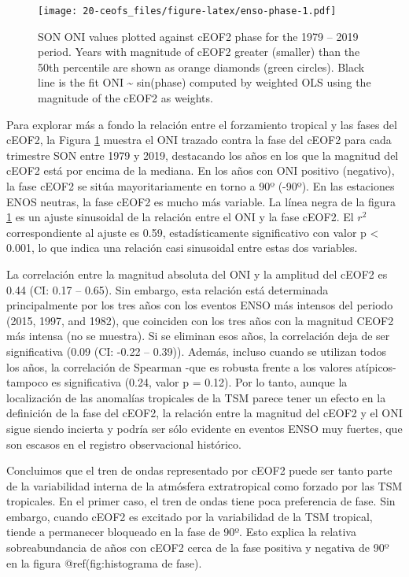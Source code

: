 \documentclass[12pt,oneside]{reedthesis}
\begin{document}
\begin{figure}
\centering
\texttt{[image: 20-ceofs\_files/figure-latex/enso-phase-1.pdf]}
\caption{\label{fig:enso-phase}SON ONI values plotted against cEOF2 phase for the 1979 -- 2019 period. Years with magnitude of cEOF2 greater (smaller) than the 50th percentile are shown as orange diamonds (green circles). Black line is the fit ONI \textasciitilde{} sin(phase) computed by weighted OLS using the magnitude of the cEOF2 as weights.}
\end{figure}
Para explorar más a fondo la relación entre el forzamiento tropical y las fases del cEOF2, la Figura \ref{fig:enso-phase} muestra el ONI trazado contra la fase del cEOF2 para cada trimestre SON entre 1979 y 2019, destacando los años en los que la magnitud del cEOF2 está por encima de la mediana.
En los años con ONI positivo (negativo), la fase cEOF2 se sitúa mayoritariamente en torno a 90º (-90º).
En las estaciones ENOS neutras, la fase cEOF2 es mucho más variable.
La línea negra de la figura \ref{fig:enso-phase} es un ajuste sinusoidal de la relación entre el ONI y la fase cEOF2.
El \(r^2\) correspondiente al ajuste es 0.59, estadísticamente significativo con valor p \textless{} 0.001, lo que indica una relación casi sinusoidal entre estas dos variables.

La correlación entre la magnitud absoluta del ONI y la amplitud del cEOF2 es 0.44 (CI: 0.17 -- 0.65).
Sin embargo, esta relación está determinada principalmente por los tres años con los eventos ENSO más intensos del periodo (2015, 1997, and 1982), que coinciden con los tres años con la magnitud CEOF2 más intensa (no se muestra).
Si se eliminan esos años, la correlación deja de ser significativa (0.09 (CI: -0.22 -- 0.39)).
Además, incluso cuando se utilizan todos los años, la correlación de Spearman -que es robusta frente a los valores atípicos- tampoco es significativa (0.24, valor p = 0.12).
Por lo tanto, aunque la localización de las anomalías tropicales de la TSM parece tener un efecto en la definición de la fase del cEOF2, la relación entre la magnitud del cEOF2 y el ONI sigue siendo incierta y podría ser sólo evidente en eventos ENSO muy fuertes, que son escasos en el registro observacional histórico.

Concluimos que el tren de ondas representado por cEOF2 puede ser tanto parte de la variabilidad interna de la atmósfera extratropical como forzado por las TSM tropicales.
En el primer caso, el tren de ondas tiene poca preferencia de fase.
Sin embargo, cuando cEOF2 es excitado por la variabilidad de la TSM tropical, tiende a permanecer bloqueado en la fase de 90º.
Esto explica la relativa sobreabundancia de años con cEOF2 cerca de la fase positiva y negativa de 90º en la figura @ref(fig:histograma de fase).
\end{document}
